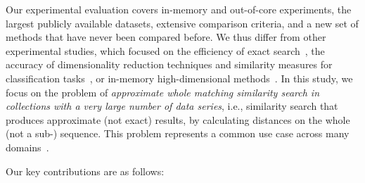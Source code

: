 Our experimental evaluation covers in-memory and out-of-core experiments, the largest publicly available datasets, extensive comparison criteria, and a new set of methods that have never been compared before. 
We thus differ from other experimental studies, which focused on the efficiency of exact search~\cite{journal/pvldb/echihabi2018}, the accuracy of dimensionality reduction techniques and similarity measures for classification tasks~\cite{journal/dmkd/Keogh2003,conf/vldb/Ding2008,DBLP:journals/datamine/BagnallLBLK17}, or in-memory high-dimensional methods~\cite{journal/tkde/li19, conf/sisap/martin17, journal/pvld/naidan2015}. 
In this study, we focus on the problem of \emph{approximate whole matching similarity search in collections with a very large number of data series}, i.e., similarity search that produces approximate (not exact) results, by calculating distances on the whole (not a sub-) sequence.
This problem represents a common use case across many domains~\cite{journal/tpami/ge2014,conf/vldb/sun14,journal/pami/babenko15,journal/corr/malkov16,DBLP:conf/kdd/ColeSZ05,DBLP:conf/sigmod/ManninoA18,DBLP:conf/edbt/GogolouTPB19,Palpanas2019}. 



Our key contributions are as follows:

